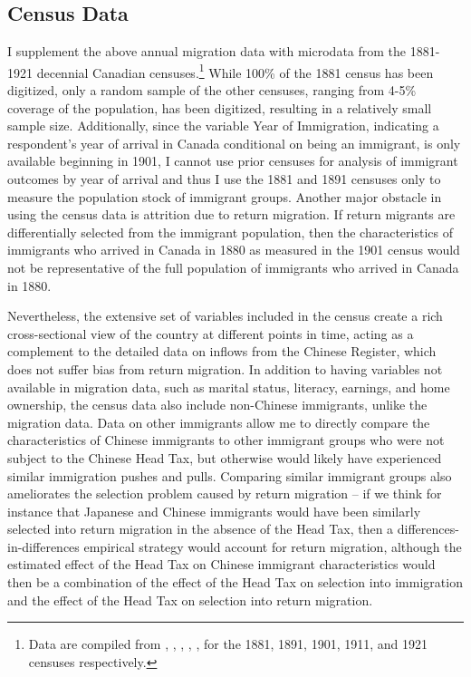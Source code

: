 \subsection{Census Data}
I supplement the above annual migration data with microdata from the 1881-1921 decennial Canadian censuses.\footnote{Data are compiled from \citet{census1881}, \citet{census1891}, \citet{census1901}, \citet{census1911}, \citet{census1921}, for the 1881, 1891, 1901, 1911, and 1921 censuses respectively.} While 100\% of the 1881 census has been digitized, only a random sample of the other censuses, ranging from 4-5\% coverage of the population, has been digitized, resulting in a relatively small sample size. Additionally, since the variable Year of Immigration, indicating a respondent's year of arrival in Canada conditional on being an immigrant, is only available beginning in 1901, I cannot use prior censuses for analysis of immigrant outcomes by year of arrival and thus I use the 1881 and 1891 censuses only to measure the population stock of immigrant groups. 
Another major obstacle in using the census data is attrition due to return migration. If return migrants are differentially selected from the immigrant population, then the characteristics of immigrants who arrived in Canada in 1880 as measured in the 1901 census would not be representative of the full population of immigrants who arrived in Canada in 1880. 

Nevertheless, the extensive set of variables included in the census create a rich cross-sectional view of the country at different points in time, acting as a complement to the detailed data on inflows from the Chinese Register, which does not suffer bias from return migration. In addition to having variables not available in migration data, such as marital status, literacy, earnings, and home ownership, the census data also include non-Chinese immigrants, unlike the migration data. Data on other immigrants allow me to directly compare the characteristics of Chinese immigrants to other immigrant groups who were not subject to the Chinese Head Tax, but otherwise would likely have experienced similar immigration pushes and pulls. 
Comparing similar immigrant groups also ameliorates the selection problem caused by return migration -- if we think for instance that Japanese and Chinese immigrants would have been similarly selected into return migration in the absence of the Head Tax, then a differences-in-differences empirical strategy would account for return migration, although the estimated effect of the Head Tax on Chinese immigrant characteristics would then be a combination of the effect of the Head Tax on selection into immigration and the effect of the Head Tax on selection into return migration.

